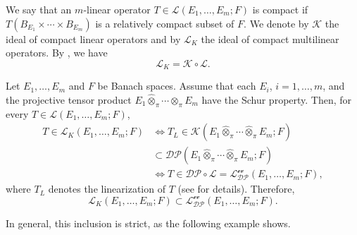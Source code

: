 \documentclass[12 pt]{article}%
\newtheorem{final remark}[theorem]{Final Remark}
\begin{document}
We say that an $m$-linear operator $T \in \mathcal{L}(E_1,\dots, E_m; F)$ is compact if 
$T(B_{E_1}\times \cdots \times B_{E_m})$ is a relatively compact subset of $F$. 
We denote by $\mathcal{K}$ the ideal of compact linear operators and by $\mathcal{L}_K$ 
the ideal of compact multilinear operators. By \cite{P63}, we have
\begin{equation*}
	\mathcal{L}_K = \mathcal{K} \circ \mathcal{L}.
\end{equation*}

Let $E_1,\dots, E_m$ and $F$ be Banach spaces. Assume that each $E_i$, $i=1,\dots,m$, 
and the projective tensor product $E_1 \hat{\otimes}_{\pi} \cdots \hat{\otimes}_{\pi} E_m$ 
have the Schur property. Then, for every $T \in \mathcal{L}(E_1,\dots, E_m; F)$,
\begin{align*}
	T \in \mathcal{L}_K(E_1,\dots, E_m; F) 
	&\iff T_L \in \mathcal{K}(E_1 \hat{\otimes}_{\pi} \cdots \hat{\otimes}_{\pi} E_m; F) \\
	&\subset \mathcal{DP}(E_1 \hat{\otimes}_{\pi} \cdots \hat{\otimes}_{\pi} E_m; F) \\
	&\iff T \in \mathcal{DP} \circ \mathcal{L} 
	= \mathcal{L_{DP}^{\text{ev}}}(E_1,\dots, E_m; F),
\end{align*}
where $T_L$ denotes the linearization of $T$ (see \cite{BPR07} for details). Therefore,
\begin{equation*}
	\mathcal{L}_K(E_1,\dots, E_m; F) 
	\subset \mathcal{L_{DP}^{\text{ev}}}(E_1,\dots, E_m; F).
\end{equation*}

In general, this inclusion is strict, as the following example shows.
\end{document}

